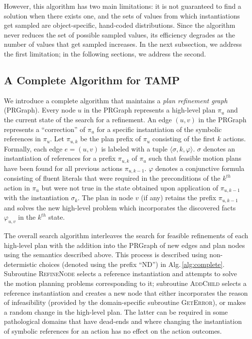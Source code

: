 However, this algorithm has two
main limitations: it is not guaranteed to find a solution when
there exists one, and the sets of values from which instantiations
get sampled are object-specific, hand-coded distributions. Since the algorithm
never reduces the set of possible sampled values, its
efficiency degrades as the number of values that get sampled increases. In the next subsection,
we address the first limitation; in the following sections, we address the second.

\subsection{A Complete Algorithm for TAMP}
We introduce a complete algorithm that maintains a \emph{plan
  refinement graph} (PRGraph). Every node $u$ in the PRGraph
represents a high-level plan $\pi_u$ and the current state of the search
for a refinement. An edge $(u,v)$ in the PRGraph
represents a ``correction'' of $\pi_u$ for a specific instantiation of
the symbolic references in $\pi_u$. Let $\pi_{u,k}$ be the plan prefix of
$\pi_u$ consisting of the first $k$ actions. Formally, each edge
$e=(u,v)$ is labeled with a tuple $\langle \sigma, k, \varphi \rangle$.
$\sigma$ denotes an instantiation of references for a prefix $\pi_{u,k}$ of
$\pi_u$ such that feasible motion plans have been found for all
previous actions $\pi_{u,k-1}$. $\varphi$ denotes a conjunctive formula
consisting of fluent literals
that were required in the preconditions of the $k^{th}$ action in
$\pi_u$ but were not true in the state obtained upon
application of $\pi_{u,k-1}$ with the instantiation $\sigma_k$.  The
plan in node $v$ (if any) retains the prefix $\pi_{u,k-1}$ and solves
the new high-level problem which incorporates the discovered facts $\varphi_{u,v}$
in the $k^{th}$ state.

The overall search algorithm interleaves the search for feasible
refinements of each high-level plan with the addition into the
PRGraph of new edges and plan nodes using the semantics described
above. This process is described using non-determistic choices
(denoted using the prefix ``ND'') in
Alg.\,\ref{alg:complete}. Subroutine \textsc{RefineNode} selects a
reference instantiation and attempts to solve the motion planning
problems corresponding to it; subroutine \textsc{AddChild} selects a
reference instantiation and creates a new node that either
incorporates the reason of infeasibility (provided by the
domain-specific subroutine \textsc{GetError}), or makes a random
change in the high-level plan. The latter can be required in some
pathological domains that have dead-ends and where changing the
instantiation of symbolic references for an action has no effect on the
action outcomes.

